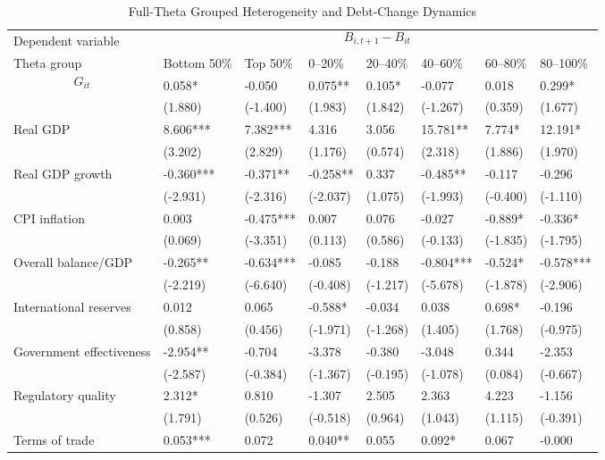 \begin{table}[H]\centering
\begin{threeparttable}
\caption{Full-Theta Grouped Heterogeneity and Debt-Change Dynamics}
\label{tab:theta_group_heterogeneity_debt}
\scriptsize
\begin{tabularx}{\textwidth}{lYYYYYYY}
\toprule
Dependent variable &  \\
\cmidrule(lr){2-8}
Theta group & Bottom 50\% & Top 50\% & 0--20\% & 20--40\% & 40--60\% & 60--80\% & 80--100\% \\
\midrule
$$G_{it}$$ & 0.058* & -0.050 & 0.075** & 0.105* & -0.077 & 0.018 & 0.299* \\
  & (1.880) & (-1.400) & (1.983) & (1.842) & (-1.267) & (0.359) & (1.677) \\
Real GDP & 8.606*** & 7.382*** & 4.316 & 3.056 & 15.781** & 7.774* & 12.191* \\
  & (3.202) & (2.829) & (1.176) & (0.574) & (2.318) & (1.886) & (1.970) \\
Real GDP growth & -0.360*** & -0.371** & -0.258** & 0.337 & -0.485** & -0.117 & -0.296 \\
  & (-2.931) & (-2.316) & (-2.037) & (1.075) & (-1.993) & (-0.400) & (-1.110) \\
CPI inflation & 0.003 & -0.475*** & 0.007 & 0.076 & -0.027 & -0.889* & -0.336* \\
  & (0.069) & (-3.351) & (0.113) & (0.586) & (-0.133) & (-1.835) & (-1.795) \\
Overall balance/GDP & -0.265** & -0.634*** & -0.085 & -0.188 & -0.804*** & -0.524* & -0.578*** \\
  & (-2.219) & (-6.640) & (-0.408) & (-1.217) & (-5.678) & (-1.878) & (-2.906) \\
International reserves & 0.012 & 0.065 & -0.588* & -0.034 & 0.038 & 0.698* & -0.196 \\
  & (0.858) & (0.456) & (-1.971) & (-1.268) & (1.405) & (1.768) & (-0.975) \\
Government effectiveness & -2.954** & -0.704 & -3.378 & -0.380 & -3.048 & 0.344 & -2.353 \\
  & (-2.587) & (-0.384) & (-1.367) & (-0.195) & (-1.078) & (0.084) & (-0.667) \\
Regulatory quality & 2.312* & 0.810 & -1.307 & 2.505 & 2.363 & 4.223 & -1.156 \\
  & (1.791) & (0.526) & (-0.518) & (0.964) & (1.043) & (1.115) & (-0.391) \\
Terms of trade & 0.053*** & 0.072 & 0.040** & 0.055 & 0.092* & 0.067 & -0.000 \\

\end{tabularx}
\end{threeparttable}
\end{table}
